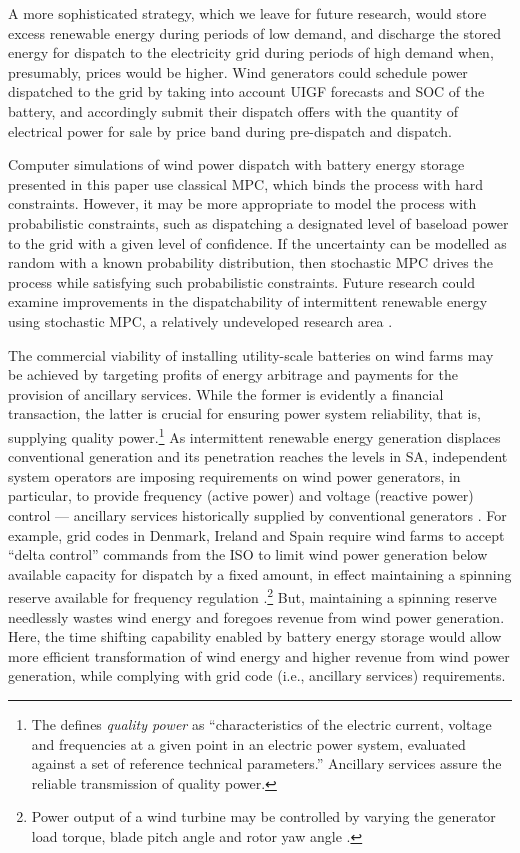 A more sophisticated strategy, which we leave for future research, would store excess renewable energy during periods of low demand, and discharge the stored energy for dispatch to the electricity grid during periods of high demand when, presumably, prices would be higher.  Wind generators could schedule power dispatched to the grid by taking into account UIGF forecasts and SOC of the battery, and accordingly submit their dispatch offers with the quantity of electrical power for sale by price band during pre-dispatch and dispatch.

Computer simulations of wind power dispatch with battery energy storage presented in this paper use classical MPC, which binds the process with hard constraints.  However, it may be more appropriate to model the process with probabilistic constraints, such as dispatching a designated level of baseload power to the grid with a given level of confidence.  If the uncertainty can be modelled as random with a known probability distribution, then stochastic MPC drives the process while satisfying such probabilistic constraints.  Future research could examine improvements in the dispatchability of intermittent renewable energy using stochastic MPC, a relatively undeveloped research area \citep[chap.~1]{KC16}.

The commercial viability of installing utility-scale batteries on wind farms may be achieved by targeting profits of energy arbitrage and payments for the provision of ancillary services.  While the former is evidently a financial transaction, the latter is crucial for ensuring power system reliability, that is, supplying quality power.\footnote{
The \citet[IEC 60050--617,][]{IEC617} defines \textit{quality power} as ``characteristics of the electric current, voltage and frequencies at a given point in an electric power system, evaluated against a set of reference technical parameters.''  Ancillary services assure the reliable transmission of quality power.	
}  As intermittent renewable energy generation displaces conventional generation and its penetration reaches the levels in SA, independent system operators are imposing requirements on wind power generators, in particular, to provide frequency (active power) and voltage (reactive power) control --- ancillary services historically supplied by conventional generators \citep{ABLFJD12}.  For example, grid codes in Denmark, Ireland and Spain require wind farms to accept ``delta control''  commands from the ISO to limit wind power generation below available capacity for dispatch by a fixed amount, in effect maintaining a spinning reserve available for frequency regulation \citep{ECAR11}.\footnote{
Power output of a wind turbine may be controlled by varying the generator load torque, blade pitch angle and rotor yaw angle \citep{ABLFJD12}.
}  But, maintaining a spinning reserve needlessly wastes wind energy and foregoes revenue from wind power generation.  Here, the time shifting capability enabled by battery energy storage would allow more efficient transformation of wind energy and higher revenue from wind power generation, while complying with grid code (i.e., ancillary services) requirements.
	
